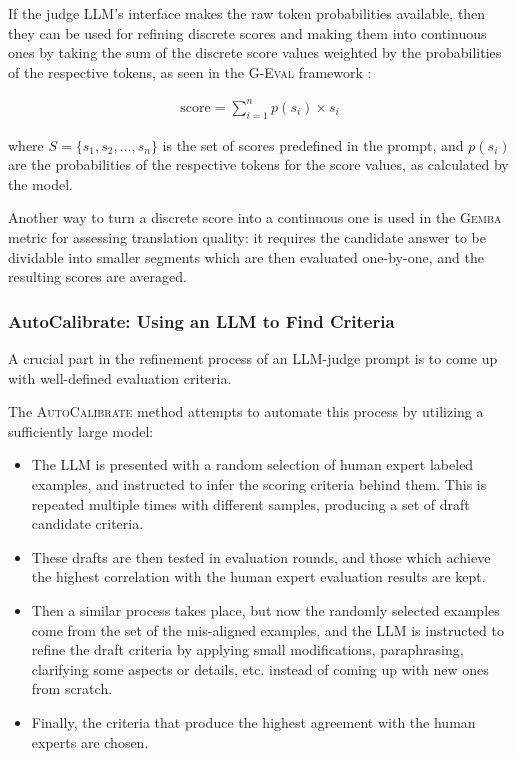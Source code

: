 \documentclass[UTF8,noindent,nohyp,parspace,titlepage,twoside,12pt]{article}
\begin{document}
        If the judge LLM's interface makes the raw token probabilities
        available, then they can be used for refining discrete scores and
        making them into continuous ones by taking the sum of the discrete
        score values weighted by the probabilities of the respective tokens, as
        seen in the \textsc{G-Eval} framework \cite{geval}:

        \begin{align}
          \text{score} = \sum_{i=1}^n p(s_i) \times s_i
        \end{align}

        where $S = \{s_1, s_2, \ldots, s_n\}$ is the set of scores predefined
        in the prompt, and $p(s_i)$ are the probabilities of the respective
        tokens for the score values, as calculated by the model.

        Another way to turn a discrete score into a continuous one is used
        in the \textsc{Gemba} metric \cite{gemba} for assessing translation
        quality: it requires the candidate answer to be dividable into smaller
        segments which are then evaluated one-by-one, and the resulting scores
        are averaged.

      \subsubsection{AutoCalibrate: Using an LLM to Find Criteria}

        A crucial part in the refinement process of an LLM-judge prompt is to
        come up with well-defined evaluation criteria.

        The \textsc{AutoCalibrate} method \cite{autocal} attempts to automate
        this process by utilizing a sufficiently large model:

        \begin{itemize}
          \item The LLM is presented with a random selection of human expert
                labeled examples, and instructed to infer the scoring
                criteria behind them. This is repeated multiple times with
                different samples, producing a set of draft candidate criteria.

          \item These drafts are then tested in evaluation rounds, and those
                which achieve the highest correlation with the human expert
                evaluation results are kept.

          \item Then a similar process takes place, but now the randomly
                selected examples come from the set of the mis-aligned
                examples, and the LLM is instructed to refine the draft
                criteria by applying small modifications, paraphrasing,
                clarifying some aspects or details, etc. instead of coming up
                with new ones from scratch.

          \item Finally, the criteria that produce the highest agreement with
                the human experts are chosen.
      \end{itemize}
\end{document}
